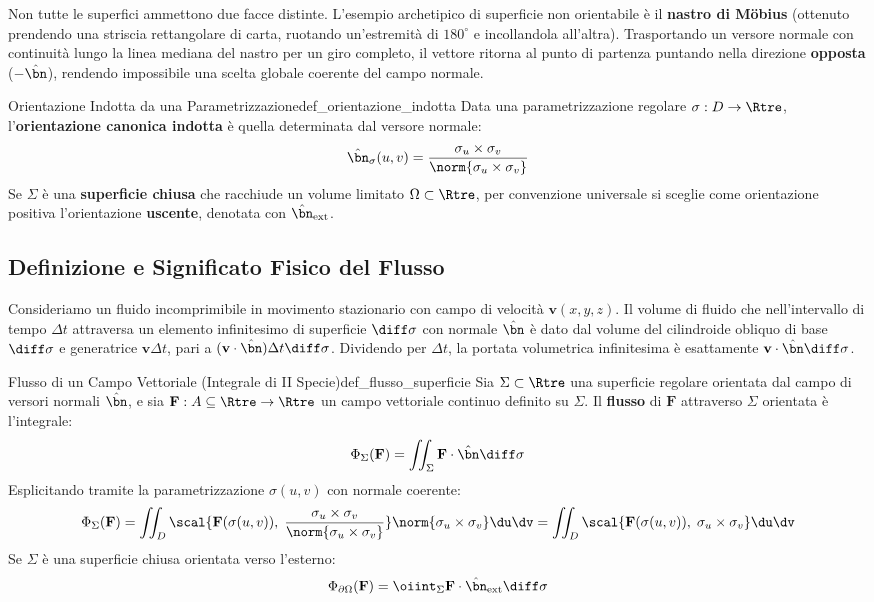 \begin{osservazione}
Non tutte le superfici ammettono due facce distinte. L'esempio archetipico di superficie non orientabile è il \textbf{nastro di Möbius} (ottenuto prendendo una striscia rettangolare di carta, ruotando un'estremità di $180^\circ$ e incollandola all'altra). Trasportando un versore normale con continuità lungo la linea mediana del nastro per un giro completo, il vettore ritorna al punto di partenza puntando nella direzione \textbf{opposta} ($-\hat{\bn}$), rendendo impossibile una scelta globale coerente del campo normale.
\end{osservazione}

\begin{definizione}{Orientazione Indotta da una Parametrizzazione}{def_orientazione_indotta}
Data una parametrizzazione regolare $\sigma: D \to \Rtre$, l'\textbf{orientazione canonica indotta} è quella determinata dal versore normale:
\[
\hat{\bn}_\sigma(u,v) = \frac{\sigma_u \times \sigma_v}{\norm{\sigma_u \times \sigma_v}}
\]
Se $\Sigma$ è una \textbf{superficie chiusa} che racchiude un volume limitato $\Omega \subset \Rtre$, per convenzione universale si sceglie come orientazione positiva l'orientazione \textbf{uscente}, denotata con $\hat{\bn}_{\text{ext}}$.
\end{definizione}

\subsection{Definizione e Significato Fisico del Flusso}

Consideriamo un fluido incomprimibile in movimento stazionario con campo di velocità $\mathbf{v}(x,y,z)$. Il volume di fluido che nell'intervallo di tempo $\Delta t$ attraversa un elemento infinitesimo di superficie $\diff\sigma$ con normale $\hat{\bn}$ è dato dal volume del cilindroide obliquo di base $\diff\sigma$ e generatrice $\mathbf{v} \Delta t$, pari a $(\mathbf{v} \cdot \hat{\bn}) \Delta t \diff\sigma$. Dividendo per $\Delta t$, la portata volumetrica infinitesima è esattamente $\mathbf{v} \cdot \hat{\bn} \diff\sigma$.

\begin{definizione}{Flusso di un Campo Vettoriale (Integrale di II Specie)}{def_flusso_superficie}
Sia $\Sigma \subset \Rtre$ una superficie regolare orientata dal campo di versori normali $\hat{\bn}$, e sia $\mathbf{F}: A \subseteq \Rtre \to \Rtre$ un campo vettoriale continuo definito su $\Sigma$.
Il \textbf{flusso} di $\mathbf{F}$ attraverso $\Sigma$ orientata è l'integrale:
\[
\Phi_\Sigma(\mathbf{F}) = \iint_\Sigma \mathbf{F} \cdot \hat{\bn} \diff\sigma
\]
Esplicitando tramite la parametrizzazione $\sigma(u,v)$ con normale coerente:
\[
\Phi_\Sigma(\mathbf{F}) = \iint_D \scal{ \mathbf{F}(\sigma(u,v)), \; \frac{\sigma_u \times \sigma_v}{\norm{\sigma_u \times \sigma_v}} } \norm{\sigma_u \times \sigma_v} \du\dv = \iint_D \scal{ \mathbf{F}(\sigma(u,v)), \; \sigma_u \times \sigma_v } \du\dv
\]
Se $\Sigma$ è una superficie chiusa orientata verso l'esterno:
\[
\Phi_{\partial \Omega}(\mathbf{F}) = \oiint_{\Sigma} \mathbf{F} \cdot \hat{\bn}_{\text{ext}} \diff\sigma
\]
\end{definizione}

